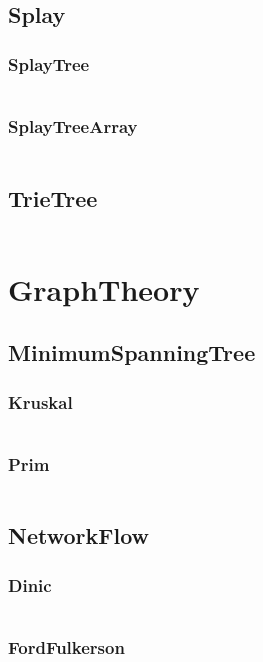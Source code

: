 \documentclass[a4paper,11pt]{article}
\begin{document}
\subsection{Splay}
\subsubsection{SplayTree}
\inputminted[breaklines]{c++}{03++DataStructure/+Splay/+SplayTree.cpp}
\subsubsection{SplayTreeArray}
\inputminted[breaklines]{c++}{03++DataStructure/+Splay/+SplayTreeArray.cpp}

\subsection{TrieTree}
\inputminted[breaklines]{c++}{03++DataStructure/+TrieTree.cpp}

\newpage
\section{GraphTheory}
\subsection{MinimumSpanningTree}
\subsubsection{Kruskal}
\inputminted[breaklines]{c++}{04++GraphTheory/+MinimumSpanningTree/+Kruskal.cpp}
\subsubsection{Prim}
\inputminted[breaklines]{c++}{04++GraphTheory/+MinimumSpanningTree/+Prim.cpp}

\subsection{NetworkFlow}
\subsubsection{Dinic}
\inputminted[breaklines]{c++}{04++GraphTheory/+NetworkFlow/+Dinic.cpp}
\subsubsection{FordFulkerson}
\inputminted[breaklines]{c++}{04++GraphTheory/+NetworkFlow/+FordFulkerson.cpp}
\end{document}
